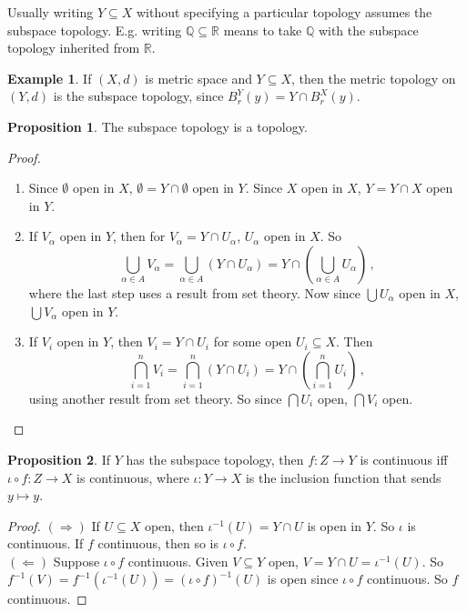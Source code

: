 \documentclass[a4paper,11pt]{article}
\theoremstyle{definition}
\newtheorem*{prop}{Proposition}
\newtheorem*{ex}{Example}
\numberwithin{equation}{section}
\begin{document}
Usually writing $Y\subseteq X$ without specifying a particular topology assumes the subspace topology. E.g. writing $\mathbb{Q}\subseteq\mathbb{R}$ means to take $\mathbb{Q}$ with the subspace topology inherited from $\mathbb{R}$.

\begin{ex}
If $(X,d)$ is metric space and $Y\subseteq X$, then the metric topology on $(Y,d)$ is the subspace topology, since $B_r^Y(y)=Y\cap B^X_r(y)$.
\end{ex}

\begin{prop}
    The subspace topology is a topology.
\end{prop}
\begin{proof}
\leavevmode
    \begin{enumerate}
        \item Since $\emptyset$ open in $X$, $\emptyset = Y\cap\emptyset$ open in $Y$. Since $X$ open in $X$, $Y=Y\cap X$ open in $Y$.
        \item If $V_\alpha$ open in $Y$, then for $V_\alpha=Y\cap U_\alpha$, $U_\alpha$ open in $X$. So
        \begin{equation}
                \bigcup_{\alpha\in A}V_\alpha=\bigcup_{\alpha\in A}(Y\cap U_\alpha) = Y\cap\left(\bigcup_{\alpha\in A} U_\alpha\right)\,,
        \end{equation}
         where the last step uses a result from set theory. Now since $\bigcup U_\alpha$ open in $X$, $\bigcup V_\alpha$ open in $Y$.
        \item If $V_i$ open in $Y$, then $V_i=Y\cap U_i$ for some open $U_i\subseteq X$. Then
        \begin{equation}
            \bigcap_{i=1}^nV_i= \bigcap_{i=1}^n (Y\cap U_i) = Y\cap\left(\bigcap_{i=1}^nU_i\right)\,,
         \end{equation}
        using another result from set theory. So since $\bigcap U_i$ open, $\bigcap V_i$ open.
    \end{enumerate}
\end{proof}

\begin{prop}
    If $Y$ has the subspace topology, then $f:Z\rightarrow Y$ is continuous iff $\iota\circ f:Z\rightarrow X$ is continuous, where $\iota:Y\rightarrow X$ is the inclusion function that sends $y\mapsto y$.
\end{prop}

\begin{proof}
$(\Rightarrow)$ If $U\subseteq X$ open, then $\iota^{-1}(U)=Y\cap U$ is open in $Y$. So $\iota$ is continuous. If $f$ continuous, then so is $\iota\circ f$.\\
$(\Leftarrow)$ Suppose $\iota\circ f$ continuous. Given $V\subseteq Y$ open, $V=Y\cap U=\iota^{-1}(U)$. So $f^{-1}(V)=f^{-1}(\iota^{-1}(U))=(\iota\circ f)^{-1}(U)$ is open since $\iota\circ f$ continuous. So $f$ continuous.
\end{proof}
\end{document}
